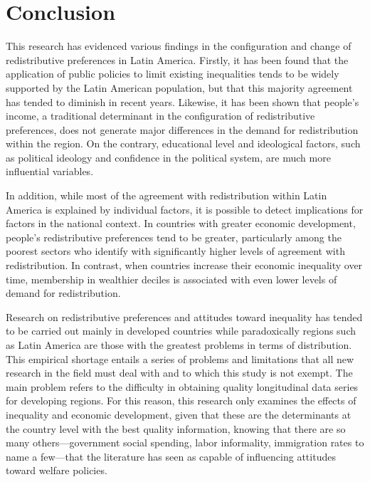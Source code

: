 \documentclass[utf8]{frontiersSCNS} %
\begin{document}
\section{Conclusion}

This research has evidenced various findings in the configuration and change of redistributive preferences in Latin America. Firstly, it has been found that the application of public policies to limit existing inequalities tends to be widely supported by the Latin American population, but that this majority agreement has tended to diminish in recent years. Likewise, it has been shown that people’s income, a traditional determinant in the configuration of redistributive preferences, does not generate major differences in the demand for redistribution within the region. On the contrary, educational level and ideological factors, such as political ideology and confidence in the political system, are much more influential variables.

In addition, while most of the agreement with redistribution within Latin America is explained by individual factors, it is possible to detect implications for factors in the national context. In countries with greater economic development, people’s redistributive preferences tend to be greater, particularly among the poorest sectors who identify with significantly higher levels of agreement with redistribution. In contrast, when countries increase their economic inequality over time, membership in wealthier deciles is associated with even lower levels of demand for redistribution.

Research on redistributive preferences and attitudes toward inequality has tended to be carried out mainly in developed countries while paradoxically regions such as Latin America are those with the greatest problems in terms of distribution. This empirical shortage entails a series of problems and limitations that all new research in the field must deal with and to which this study is not exempt. The main problem refers to the difficulty in obtaining quality longitudinal data series for developing regions. For this reason, this research only examines the effects of inequality and economic development, given that these are the determinants at the country level with the best quality information, knowing that there are so many others—government social spending, labor informality, immigration rates to name a few—that the literature has seen as capable of influencing attitudes toward welfare policies.
\end{document}

